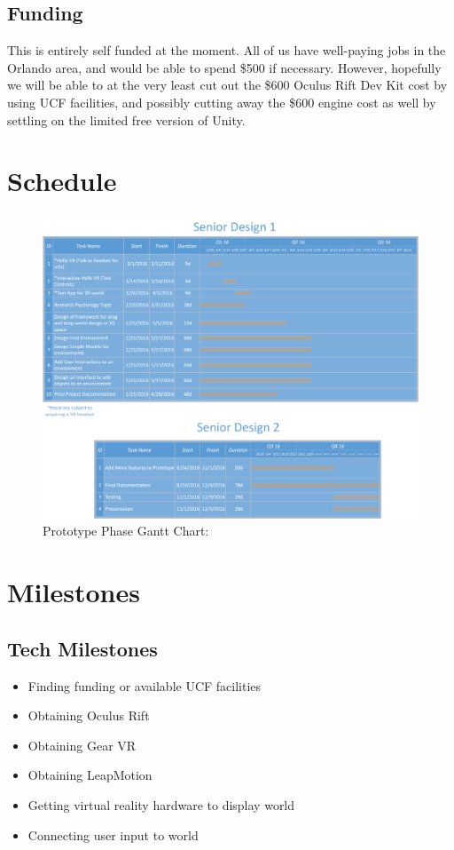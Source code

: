 \documentclass[a4paper,10pt,twoside]{article}
\begin{document}
			    \subsection{Funding}
			    This is entirely self funded at the moment.  All of us have well-paying jobs in the 
			    Orlando area, and would be able to spend \$500 if necessary.  However, hopefully we will be able to at the very least cut out the 
			    \$600 Oculus Rift Dev Kit cost by using UCF facilities, and possibly cutting away the \$600 engine cost as well by settling on the limited free version of Unity.  
	\section{Schedule}
	\begin{figure}[H]
	\includegraphics[width=\linewidth]{scheduleSR.png}
	\caption{Prototype Phase Gantt Chart:}
	\label{fig:pchart}
	\end{figure}
	\section{Milestones}
	\subsection{Tech Milestones}
		\begin{itemize}
			\item Finding funding or available UCF facilities
			\item Obtaining Oculus Rift
			\item Obtaining Gear VR
			\item Obtaining LeapMotion
			\item Getting virtual reality hardware to display world
			\item Connecting user input to world
		\end{itemize}
\end{document}
